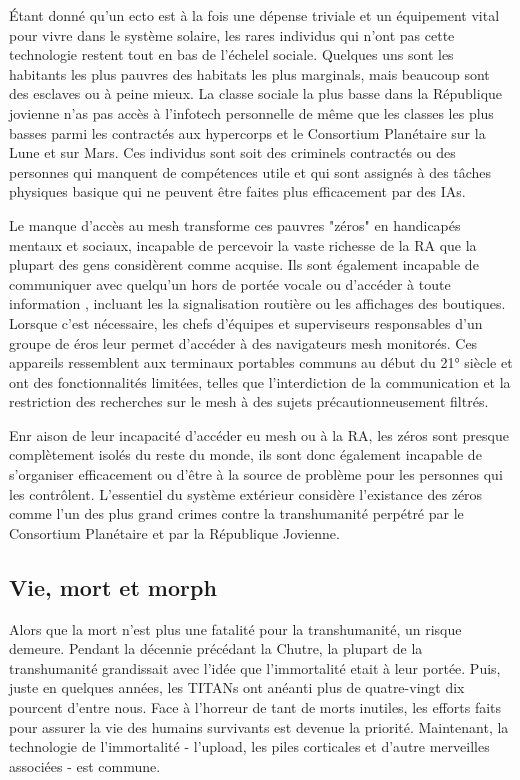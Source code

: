 Étant donné qu'un ecto est à la fois une dépense triviale et un équipement vital pour vivre dans le système solaire, les rares individus qui n'ont pas cette technologie restent tout en bas de l'échelel sociale. Quelques uns sont les habitants les plus pauvres des habitats les plus marginals, mais beaucoup sont des esclaves ou à peine mieux. La classe sociale la plus basse dans la République jovienne n'as pas accès à l'infotech personnelle de même que les classes les plus basses parmi les contractés aux hypercorps et le Consortium Planétaire sur la Lune et sur Mars. Ces individus sont soit des criminels contractés ou des personnes qui manquent de compétences utile et qui sont assignés à des tâches physiques basique qui ne peuvent être faites plus efficacement par des IAs. 

Le manque d'accès au mesh transforme ces pauvres "zéros" en handicapés mentaux et sociaux, incapable de percevoir la vaste richesse de la RA que la plupart des gens considèrent comme acquise. Ils sont également incapable de communiquer avec quelqu'un hors de portée vocale ou d'accéder à toute information , incluant les la signalisation routière ou les affichages des boutiques. Lorsque c'est nécessaire, les chefs d'équipes et superviseurs responsables d'un groupe de éros leur permet d'accéder à des navigateurs mesh monitorés. Ces appareils ressemblent aux terminaux portables communs au début du 21° siècle et ont des fonctionnalités limitées, telles que l'interdiction de la communication et la restriction des recherches sur le mesh à des sujets précautionneusement filtrés. 

Enr aison de leur incapacité d'accéder eu mesh ou à la RA, les zéros sont presque complètement isolés du reste du monde, ils sont donc également incapable de s'organiser efficacement ou d'être à la source de problème pour les personnes qui les contrôlent. L'essentiel du système extérieur considère l'existance des zéros comme l'un des plus grand crimes contre la transhumanité perpétré par le Consortium Planétaire et par la République Jovienne. 

\subsection{Vie, mort et morph} \label{sec:life-death-morphs} 

Alors que la mort n'est plus une fatalité pour la transhumanité, un risque demeure. Pendant la décennie précédant la Chutre, la plupart de la transhumanité grandissait avec l'idée que l'immortalité etait à leur portée. Puis, juste en quelques années, les TITANs ont anéanti plus de quatre-vingt dix pourcent d'entre nous. Face à l'horreur de tant de morts inutiles, les efforts faits pour assurer la vie des humains survivants est devenue la priorité. Maintenant, la technologie de l'immortalité - l'upload, les piles corticales et d'autre merveilles associées - est commune. 

